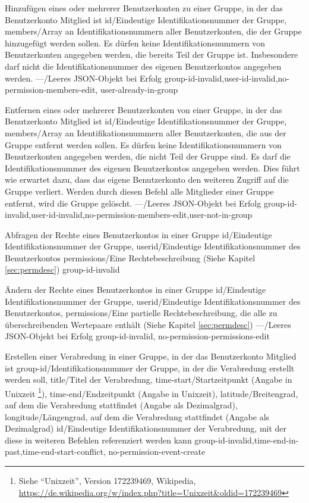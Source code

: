 \documentclass[parskip=full,11pt]{scrartcl}
\begin{document}
{Hinzufügen eines oder mehrerer Benutzerkonten zu einer Gruppe, in der das
Benutzerkonto Mitglied ist}
{id/Eindeutige Identifikationsnummer der Gruppe,
members/Array an Identifikationsnummern aller Benutzerkonten{,} die der Gruppe
hinzugefügt werden sollen.
Es dürfen keine Identifikationsnummern von Benutzerkonten angegeben werden{,}
die bereits Teil der Gruppe ist.
Insbesondere darf nicht die Identifikationsnummer des eigenen Benutzerkontos
angegeben werden.}
{---/Leeres JSON-Objekt bei Erfolg}
{group-id-invalid,user-id-invalid,no-permission-members-edit,%
user-already-in-group}

{Entfernen eines oder mehrerer Benutzerkonten von einer Gruppe, in der das
Benutzerkonto Mitglied ist}
{id/Eindeutige Identifikationsnummer der Gruppe,
members/Array an Identifikationsnummern aller Benutzerkonten{,} die aus der
Gruppe entfernt werden sollen.
Es dürfen keine Identifikationsnummern von Benutzerkonten angegeben werden{,}
die nicht Teil der Gruppe sind.
Es darf die Identifikationsnummer des eigenen Benutzerkontos angegeben werden.
Dies führt wie erwartet dazu{,} dass das eigene Benutzerkonto den weiteren
Zugriff auf die Gruppe verliert.
Werden durch diesen Befehl alle Mitglieder einer Gruppe entfernt{,} wird die
Gruppe gelöscht.}
{---/Leeres JSON-Objekt bei Erfolg}
{group-id-invalid,user-id-invalid,no-permission-members-edit,user-not-in-group}

{Abfragen der Rechte eines Benutzerkontos in einer Gruppe}
{id/Eindeutige Identifikationsnummer der Gruppe,
userid/Eindeutige Identifikationsnummer des Benutzerkontos}
{permissions/Eine Rechtebeschreibung (Siehe Kapitel \ref{sec:permdesc})}
{group-id-invalid}

{Ändern der Rechte eines Benutzerkontos in einer Gruppe}
{id/Eindeutige Identifikationsnummer der Gruppe,
userid/Eindeutige Identifikationsnummer des Benutzerkontos,
permissions/Eine partielle Rechtebeschreibung{,} die alle zu überschreibenden
Wertepaare enthält (Siehe Kapitel \ref{sec:permdesc})}
{---/Leeres JSON-Objekt bei Erfolg}
{group-id-invalid, no-permission-permissions-edit}

{Erstellen einer Verabredung in einer Gruppe, in der das Benutzerkonto Mitglied
ist}
{group-id/Identifikationsnummer der Gruppe{,} in der die Verabredung erstellt
werden soll,
title/Titel der Verabredung,
time-start/Startzeitpunkt (Angabe in Unixzeit%
\footnote{Siehe \enquote{Unixzeit}, Version 172239469, Wikipedia,\\
\url{https://de.wikipedia.org/w/index.php?title=Unixzeit&oldid=172239469}}),
time-end/Endzeitpunkt (Angabe in Unixzeit),
latitude/Breitengrad{,} auf dem die Verabredung stattfindet (Angabe als
Dezimalgrad),
longitude/Längengrad{,} auf dem die Verabredung stattfindet (Angabe als
Dezimalgrad)}
{id/Eindeutige Identifikationsnummer der Verabredung{,} mit der diese in
weiteren Befehlen referenziert werden kann}
{group-id-invalid,time-end-in-past,time-end-start-conflict,
no-permission-event-create}
\end{document}
